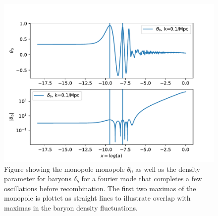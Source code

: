 \documentclass[onecolumn]{aastex62}
\begin{document}
\begin{figure}
    \includegraphics[scale=0.8]{figures/comparison0.pdf}
    \caption{Figure showing the monopole monopole $\theta_0$ as well as the density parameter for baryons $\delta_b$ for a fourier mode that completes a few oscillations before recombination. The first two maximas of the monopole is plottet as straight lines to illustrate overlap with maximas in the baryon density fluctuations.}
    \label{fig:comp0}
\end{figure}
\end{document}
